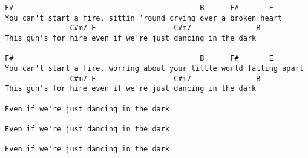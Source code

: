 \begin{verbatim}
F#                                           B      F#       E
You can't start a fire, sittin ‘round crying over a broken heart
               C#m7 E                  C#m7               B
This gun's for hire even if we're just dancing in the dark

F#                                           B      F#       E
You can't start a fire, worring about your little world falling apart
               C#m7 E                  C#m7               B
This gun's for hire even if we're just dancing in the dark

Even if we're just dancing in the dark

Even if we're just dancing in the dark

Even if we're just dancing in the dark
\end{verbatim}